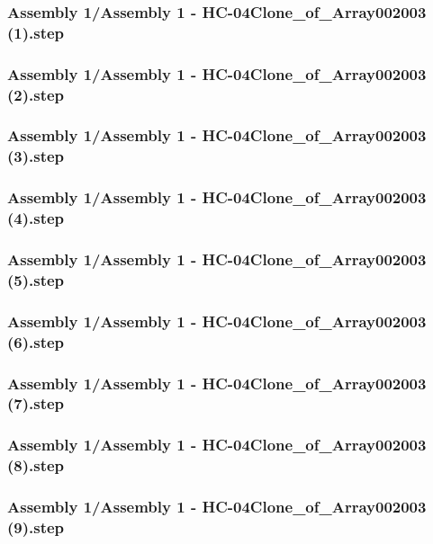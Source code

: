 \documentclass[a4paper,12pt]{article}
\begin{document}
\begin{lstlising}[language=C++]
\subsubsection{Assembly 1/Assembly 1 - HC-04Clone_of_Array002003 (1).step}

\subsubsection{Assembly 1/Assembly 1 - HC-04Clone_of_Array002003 (2).step}

\subsubsection{Assembly 1/Assembly 1 - HC-04Clone_of_Array002003 (3).step}

\subsubsection{Assembly 1/Assembly 1 - HC-04Clone_of_Array002003 (4).step}

\subsubsection{Assembly 1/Assembly 1 - HC-04Clone_of_Array002003 (5).step}

\subsubsection{Assembly 1/Assembly 1 - HC-04Clone_of_Array002003 (6).step}

\subsubsection{Assembly 1/Assembly 1 - HC-04Clone_of_Array002003 (7).step}

\subsubsection{Assembly 1/Assembly 1 - HC-04Clone_of_Array002003 (8).step}

\subsubsection{Assembly 1/Assembly 1 - HC-04Clone_of_Array002003 (9).step}


\end{lstlising}
\end{document}

